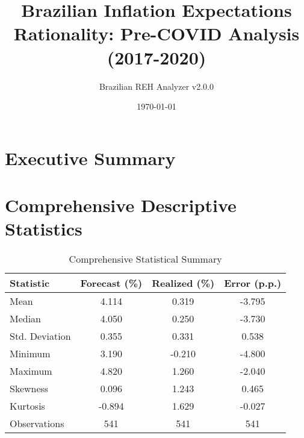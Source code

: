 \documentclass[11pt,a4paper]{article}
\title{Brazilian Inflation Expectations Rationality: Pre-COVID Analysis (2017-2020)}
\author{Brazilian REH Analyzer v2.0.0}
\date{\today}
\begin{document}
\maketitle

\section{Executive Summary}

\begin{center}
\end{center}

\section{Comprehensive Descriptive Statistics}

\begin{table}[H]
\centering
\caption{Comprehensive Statistical Summary}
\begin{tabular}{lccc}
\toprule
\textbf{Statistic} & \textbf{Forecast (\%)} & \textbf{Realized (\%)} & \textbf{Error (p.p.)} \\
\midrule
Mean & 4.114 & 0.319 & -3.795 \\
Median & 4.050 & 0.250 & -3.730 \\
Std. Deviation & 0.355 & 0.331 & 0.538 \\
Minimum & 3.190 & -0.210 & -4.800 \\
Maximum & 4.820 & 1.260 & -2.040 \\
Skewness & 0.096 & 1.243 & 0.465 \\
Kurtosis & -0.894 & 1.629 & -0.027 \\
Observations & 541 & 541 & 541 \\
\bottomrule
\end{tabular}
\end{table}
\end{document}
